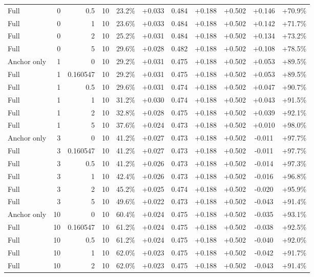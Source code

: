 \begin{table}[htbp]
\begin{tabular}{lrrrccccccc}
Full & 0 & 0.5 & 10 & 23.2\% & +0.033 & 0.484 & +0.188 & +0.502 & +0.146 & +70.9\% \\
Full & 0 & 1 & 10 & 23.6\% & +0.033 & 0.484 & +0.188 & +0.502 & +0.142 & +71.7\% \\
Full & 0 & 2 & 10 & 25.2\% & +0.031 & 0.484 & +0.188 & +0.502 & +0.134 & +73.2\% \\
Full & 0 & 5 & 10 & 29.6\% & +0.028 & 0.482 & +0.188 & +0.502 & +0.108 & +78.5\% \\
Anchor only & 1 & 0 & 10 & 29.2\% & +0.031 & 0.475 & +0.188 & +0.502 & +0.053 & +89.5\% \\
Full & 1 & 0.160547 & 10 & 29.2\% & +0.031 & 0.475 & +0.188 & +0.502 & +0.053 & +89.5\% \\
Full & 1 & 0.5 & 10 & 29.6\% & +0.031 & 0.474 & +0.188 & +0.502 & +0.047 & +90.7\% \\
Full & 1 & 1 & 10 & 31.2\% & +0.030 & 0.474 & +0.188 & +0.502 & +0.043 & +91.5\% \\
Full & 1 & 2 & 10 & 32.8\% & +0.028 & 0.475 & +0.188 & +0.502 & +0.039 & +92.1\% \\
Full & 1 & 5 & 10 & 37.6\% & +0.024 & 0.473 & +0.188 & +0.502 & +0.010 & +98.0\% \\
Anchor only & 3 & 0 & 10 & 41.2\% & +0.027 & 0.473 & +0.188 & +0.502 & -0.011 & +97.7\% \\
Full & 3 & 0.160547 & 10 & 41.2\% & +0.027 & 0.473 & +0.188 & +0.502 & -0.011 & +97.7\% \\
Full & 3 & 0.5 & 10 & 41.2\% & +0.026 & 0.473 & +0.188 & +0.502 & -0.014 & +97.3\% \\
Full & 3 & 1 & 10 & 42.4\% & +0.026 & 0.473 & +0.188 & +0.502 & -0.016 & +96.8\% \\
Full & 3 & 2 & 10 & 45.2\% & +0.025 & 0.474 & +0.188 & +0.502 & -0.020 & +95.9\% \\
Full & 3 & 5 & 10 & 49.6\% & +0.022 & 0.473 & +0.188 & +0.502 & -0.043 & +91.4\% \\
Anchor only & 10 & 0 & 10 & 60.4\% & +0.024 & 0.475 & +0.188 & +0.502 & -0.035 & +93.1\% \\
Full & 10 & 0.160547 & 10 & 61.2\% & +0.024 & 0.475 & +0.188 & +0.502 & -0.038 & +92.5\% \\
Full & 10 & 0.5 & 10 & 61.2\% & +0.024 & 0.475 & +0.188 & +0.502 & -0.040 & +92.0\% \\
Full & 10 & 1 & 10 & 62.0\% & +0.023 & 0.475 & +0.188 & +0.502 & -0.042 & +91.7\% \\
Full & 10 & 2 & 10 & 62.0\% & +0.023 & 0.475 & +0.188 & +0.502 & -0.043 & +91.4\% \\

\end{tabular}
\end{table}
